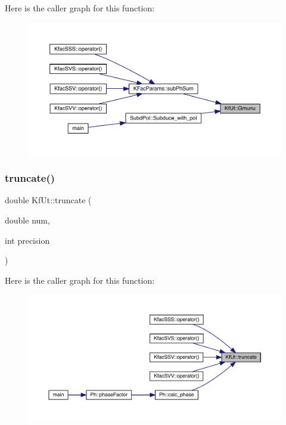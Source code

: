 Here is the caller graph for this function\+:
\nopagebreak
\begin{figure}[H]
\begin{center}
\leavevmode
\includegraphics[width=350pt]{d8/da5/namespaceKfUt_ac090f8c3b57fe35c462bd3c3c2d8f08b_icgraph}
\end{center}
\end{figure}
\mbox{\label{namespaceKfUt_a155e8db38d770e216ef19d9938394c17}} 
\subsubsection{\texorpdfstring{truncate()}{truncate()}}
{\footnotesize\ttfamily double Kf\+Ut\+::truncate (\begin{DoxyParamCaption}\item[{double}]{num,  }\item[{int}]{precision }\end{DoxyParamCaption})}

Here is the caller graph for this function\+:
\nopagebreak
\begin{figure}[H]
\begin{center}
\leavevmode
\includegraphics[width=350pt]{d8/da5/namespaceKfUt_a155e8db38d770e216ef19d9938394c17_icgraph}
\end{center}
\end{figure}
